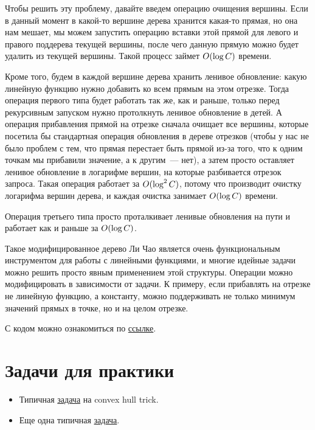 Чтобы решить эту проблему, давайте введем операцию очищения вершины. Если в данный момент в какой-то вершине дерева хранится какая-то прямая, но она нам мешает, мы можем запустить операцию вставки этой прямой для левого и правого поддерева текущей вершины, после чего данную прямую можно будет удалить из текущей вершины. Такой процесс займет $O(\log C)$ времени.

Кроме того, будем в каждой вершине дерева хранить ленивое обновление: какую линейную функцию нужно добавить ко всем прямым на этом отрезке. Тогда операция первого типа будет работать так же, как и раньше, только перед рекурсивным запуском нужно протолкнуть ленивое обновление в детей. А операция прибавления прямой на отрезке сначала очищает все вершины, которые посетила бы стандартная операция обновления в дереве отрезков (чтобы у нас не было проблем с тем, что прямая перестает быть прямой из-за того, что к одним точкам мы прибавили значение, а к другим~--- нет), а затем просто оставляет ленивое обновление в логарифме вершин, на которые разбивается отрезок запроса. Такая операция работает за $O(\log^2 C)$, потому что производит очистку логарифма вершин дерева, и каждая очистка занимает $O(\log C)$ времени.

Операция третьего типа просто проталкивает ленивые обновления на пути и работает как и раньше за $O(\log C)$.

Такое модифицированное дерево Ли Чао является очень функциональным инструментом для работы с линейными функциями, и многие идейные задачи можно решить просто явным применением этой структуры. Операции можно модифицировать в зависимости от задачи. К примеру, если прибавлять на отрезке не линейную функцию, а константу, можно поддерживать не только минимум значений прямых в точке, но и на целом отрезке.

С кодом можно ознакомиться по \href{https://pastebin.com/fYNWDXMj}{ссылке}.


\section{Задачи для практики}

\begin{itemize}
    \item Типичная \href{https://csacademy.com/contest/archive/task/squared-ends}{задача} на convex hull trick.

    \item Еще одна типичная \href{https://atcoder.jp/contests/dp/tasks/dp_z}{задача}.
   
\end{itemize}

